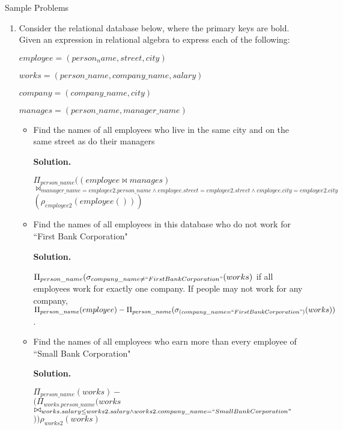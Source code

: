 \documentclass[2pt,letter]{scrartcl}
\makeatletter
\newcommand\solution{\textbf{Solution.}}
\renewcommand{\subsubsection}{\@startsection{subsubsection}{3}{0mm}
  {-1ex plus -.5ex minus -.2ex}
  {1ex plus .2ex}
{\normalfont\small\bfseries}}
\makeatother
\begin{document}
\begin{multicols}{3}
		\subsubsection{Sample Problems}
			\begin{enumerate}
				\item Consider the relational database below, where the primary keys are bold. Given an expression in relational algebra to express each of the following:
				
					$employee = (person_name, street, city)$
					
					$works = (person\_name, company\_name, salary)$
					
					$company = (company\_name, city)$
					
					$manages = (person\_name, manager\_name)$
					
					\begin{itemize}
						\item Find the names of all employees who live in the same city and on the same street as do their managers
						
						\solution
						
						$\Pi_{person\_name}((employee \bowtie manages) $ \\
						$\bowtie_{manager\_name = employee2.person\_name \wedge employee.street = employee2.street \wedge employee.city = employee2.city}$ \\
						$(\rho_{employee2}(employee()))$
						
						\item Find the names of all employees in this database who do not work for ``First Bank Corporation"
						
						\solution
						
						$\Pi_{person\_name}(\sigma_{company\_name \neq ``First Bank Corporation"}(works)$ if all employees work for exactly one company. If people may not work for any company, $\Pi_{person\_name}(employee) - \Pi_{person\_name}(\sigma_{(company\_name = ``First Bank Corporation")}(works))$.
						
						\item Find the names of all employees who earn more than every employee of ``Small Bank Corporation"
						
						\solution
						
						$\Pi_{person\_name}(works) - $\\
						$(\Pi_{works.person\_name}(works $ \\
						$\bowtie_{works.salary \leq works2.salary \wedge works2.company\_name = ``Small Bank Corporation"}$ \\
						$))\rho_{works2}(works)$
					\end{itemize}
			\end{enumerate}


\end{multicols}
\end{document}
